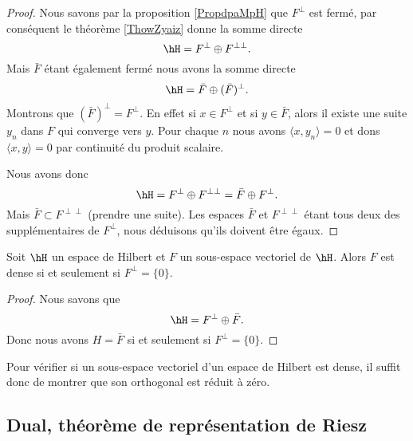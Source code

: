 \begin{proof}
    Nous savons par la proposition \ref{PropdpaMpH} que \( F^{\perp}\) est fermé, par conséquent le théorème \ref{ThowZyaiz} donne la somme directe
    \begin{equation}
        \hH=F^{\perp}\oplus F^{\perp\perp}.
    \end{equation}
    Mais \( \bar F\) étant également fermé nous avons la somme directe
    \begin{equation}
        \hH=\bar F\oplus(\bar F)^{\perp}.
    \end{equation}
    Montrons que \( (\bar F)^{\perp}=F^{\perp}\). En effet si \( x\in F^{\perp}\) et si \( y\in \bar F\), alors il existe une suite \( y_n\) dans \( F\) qui converge vers \( y\). Pour chaque \( n\) nous avons \( \langle x, y_n\rangle =0\) et dons \( \langle x, y\rangle =0\) par continuité du produit scalaire.

    Nous avons donc
    \begin{equation}
        \hH=F^{\perp}\oplus F^{\perp\perp}=\bar F\oplus F^{\perp}.
    \end{equation}
    Mais \( \bar F\subset F^{\perp\perp}\) (prendre une suite). Les espaces \( \bar F\) et \( F^{\perp\perp}\) étant tous deux des supplémentaires de \( F^{\perp}\), nous déduisons qu'ils doivent être égaux.
\end{proof}

\begin{proposition}     \label{PropqiWonByiBmc}
    Soit \( \hH\) un espace de Hilbert et \( F\) un sous-espace vectoriel de \( \hH\). Alors \( F\) est dense si et seulement si \( F^{\perp}=\{ 0 \}\).
\end{proposition}

\begin{proof}
    Nous savons que
    \begin{equation}
        \hH=F^{\perp}\oplus \bar F.
    \end{equation}
    Donc nous avons \( H=\bar F\) si et seulement si \( F^{\perp}=\{ 0 \}\).
\end{proof}
Pour vérifier si un sous-espace vectoriel d'un espace de Hilbert est dense, il suffit donc de montrer que son orthogonal est réduit à zéro.

\subsection{Dual, théorème de représentation de Riesz}

